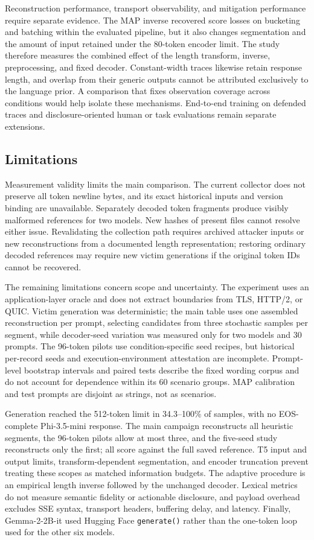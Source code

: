 \documentclass[electronics,article,submit,pdftex,moreauthors]{Definitions/mdpi}
\begin{document}
Reconstruction performance, transport observability, and mitigation performance require separate evidence. The MAP inverse recovered score losses on bucketing and batching within the evaluated pipeline, but it also changes segmentation and the amount of input retained under the 80-token encoder limit. The study therefore measures the combined effect of the length transform, inverse, preprocessing, and fixed decoder. Constant-width traces likewise retain response length, and overlap from their generic outputs cannot be attributed exclusively to the language prior. A comparison that fixes observation coverage across conditions would help isolate these mechanisms. End-to-end training on defended traces and disclosure-oriented human or task evaluations remain separate extensions.

\subsection{Limitations}
Measurement validity limits the main comparison. The current collector does not preserve all token newline bytes, and its exact historical inputs and version binding are unavailable. Separately decoded token fragments produce visibly malformed references for two models. New hashes of present files cannot resolve either issue. Revalidating the collection path requires archived attacker inputs or new reconstructions from a documented length representation; restoring ordinary decoded references may require new victim generations if the original token IDs cannot be recovered.

The remaining limitations concern scope and uncertainty. The experiment uses an application-layer oracle and does not extract boundaries from TLS, HTTP/2, or QUIC. Victim generation was deterministic; the main table uses one assembled reconstruction per prompt, selecting candidates from three stochastic samples per segment, while decoder-seed variation was measured only for two models and 30 prompts. The 96-token pilots use condition-specific seed recipes, but historical per-record seeds and execution-environment attestation are incomplete. Prompt-level bootstrap intervals and paired tests describe the fixed wording corpus and do not account for dependence within its 60 scenario groups. MAP calibration and test prompts are disjoint as strings, not as scenarios.

Generation reached the 512-token limit in 34.3--100\% of samples, with no EOS-complete Phi-3.5-mini response. The main campaign reconstructs all heuristic segments, the 96-token pilots allow at most three, and the five-seed study reconstructs only the first; all score against the full saved reference. T5 input and output limits, transform-dependent segmentation, and encoder truncation prevent treating these scopes as matched information budgets. The adaptive procedure is an empirical length inverse followed by the unchanged decoder. Lexical metrics do not measure semantic fidelity or actionable disclosure, and payload overhead excludes SSE syntax, transport headers, buffering delay, and latency. Finally, Gemma-2-2B-it used Hugging Face \texttt{generate()} rather than the one-token loop used for the other six models.
\end{document}
